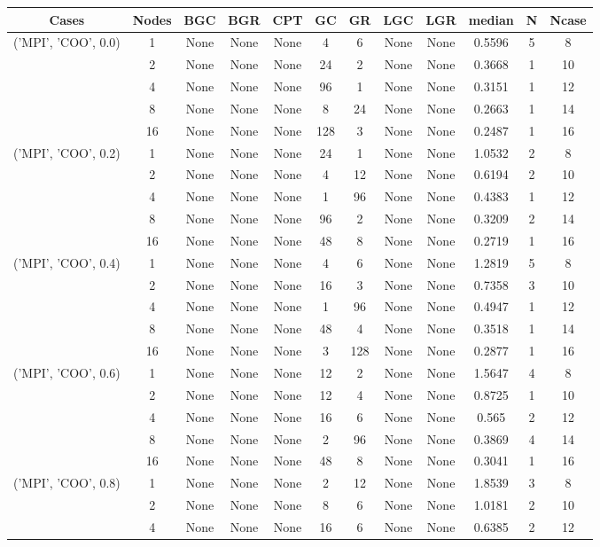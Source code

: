\begin{tabular}{cccccccccccc}
\hline
Cases & Nodes& BGC& BGR& CPT& GC& GR& LGC& LGR& median & N & Ncase \\
\hline
\multirow{5}{*}{('MPI', 'COO', 0.0)}& 1& None& None& None& 4& 6& None& None& 0.5596& 5& 8\\
& 2& None& None& None& 24& 2& None& None& 0.3668& 1& 10\\
& 4& None& None& None& 96& 1& None& None& 0.3151& 1& 12\\
& 8& None& None& None& 8& 24& None& None& 0.2663& 1& 14\\
& 16& None& None& None& 128& 3& None& None& 0.2487& 1& 16\\
\hline
\multirow{5}{*}{('MPI', 'COO', 0.2)}& 1& None& None& None& 24& 1& None& None& 1.0532& 2& 8\\
& 2& None& None& None& 4& 12& None& None& 0.6194& 2& 10\\
& 4& None& None& None& 1& 96& None& None& 0.4383& 1& 12\\
& 8& None& None& None& 96& 2& None& None& 0.3209& 2& 14\\
& 16& None& None& None& 48& 8& None& None& 0.2719& 1& 16\\
\hline
\multirow{5}{*}{('MPI', 'COO', 0.4)}& 1& None& None& None& 4& 6& None& None& 1.2819& 5& 8\\
& 2& None& None& None& 16& 3& None& None& 0.7358& 3& 10\\
& 4& None& None& None& 1& 96& None& None& 0.4947& 1& 12\\
& 8& None& None& None& 48& 4& None& None& 0.3518& 1& 14\\
& 16& None& None& None& 3& 128& None& None& 0.2877& 1& 16\\
\hline
\multirow{5}{*}{('MPI', 'COO', 0.6)}& 1& None& None& None& 12& 2& None& None& 1.5647& 4& 8\\
& 2& None& None& None& 12& 4& None& None& 0.8725& 1& 10\\
& 4& None& None& None& 16& 6& None& None& 0.565& 2& 12\\
& 8& None& None& None& 2& 96& None& None& 0.3869& 4& 14\\
& 16& None& None& None& 48& 8& None& None& 0.3041& 1& 16\\
\hline
\multirow{5}{*}{('MPI', 'COO', 0.8)}& 1& None& None& None& 2& 12& None& None& 1.8539& 3& 8\\
& 2& None& None& None& 8& 6& None& None& 1.0181& 2& 10\\
& 4& None& None& None& 16& 6& None& None& 0.6385& 2& 12\\

\end{tabular}
